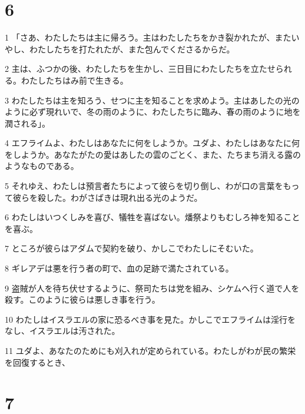 \chapter{6}

\par 1 「さあ、わたしたちは主に帰ろう。主はわたしたちをかき裂かれたが、またいやし、わたしたちを打たれたが、また包んでくださるからだ。
\par 2 主は、ふつかの後、わたしたちを生かし、三日目にわたしたちを立たせられる。わたしたちはみ前で生きる。
\par 3 わたしたちは主を知ろう、せつに主を知ることを求めよう。主はあしたの光のように必ず現れいで、冬の雨のように、わたしたちに臨み、春の雨のように地を潤される」。
\par 4 エフライムよ、わたしはあなたに何をしようか。ユダよ、わたしはあなたに何をしようか。あなたがたの愛はあしたの雲のごとく、また、たちまち消える露のようなものである。
\par 5 それゆえ、わたしは預言者たちによって彼らを切り倒し、わが口の言葉をもって彼らを殺した。わがさばきは現れ出る光のようだ。
\par 6 わたしはいつくしみを喜び、犠牲を喜ばない。燔祭よりもむしろ神を知ることを喜ぶ。
\par 7 ところが彼らはアダムで契約を破り、かしこでわたしにそむいた。
\par 8 ギレアデは悪を行う者の町で、血の足跡で満たされている。
\par 9 盗賊が人を待ち伏せするように、祭司たちは党を組み、シケムへ行く道で人を殺す。このように彼らは悪しき事を行う。
\par 10 わたしはイスラエルの家に恐るべき事を見た。かしこでエフライムは淫行をなし、イスラエルは汚された。
\par 11 ユダよ、あなたのためにも刈入れが定められている。わたしがわが民の繁栄を回復するとき、

\chapter{7}

